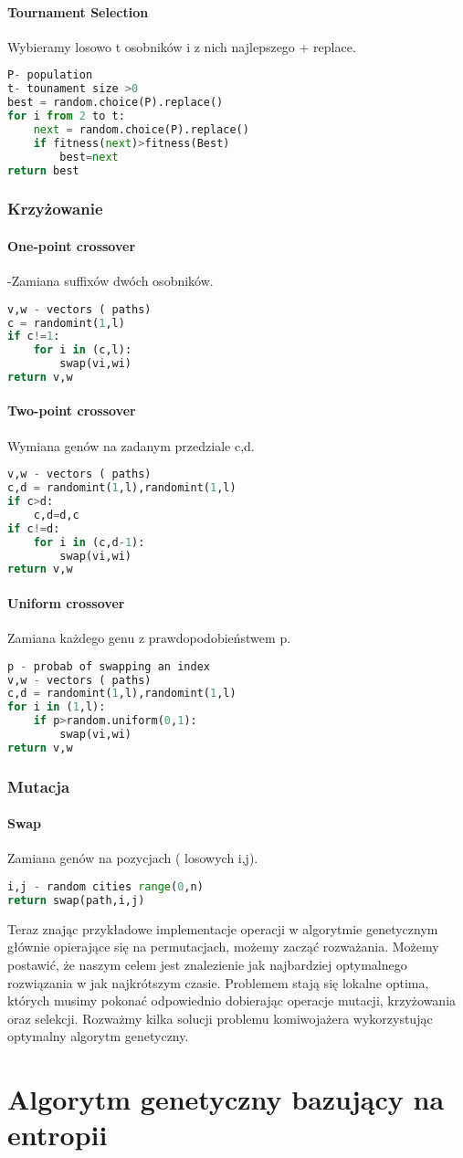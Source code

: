 \documentclass[11pt]{article}
\begin{document}
\paragraph{Tournament Selection}Wybieramy losowo t osobników i z nich najlepszego + replace.
\begin{lstlisting}[language=Python]
P- population
t- tounament size >0
best = random.choice(P).replace()
for i from 2 to t:
	next = random.choice(P).replace()
	if fitness(next)>fitness(Best)
		best=next
return best
\end{lstlisting}

\subsubsection{Krzyżowanie}
\paragraph{One-point crossover}-Zamiana suffixów dwóch osobników.
\begin{lstlisting}[language=Python ]
v,w - vectors ( paths)
c = randomint(1,l)
if c!=1:
	for i in (c,l):
		swap(vi,wi)
return v,w
\end{lstlisting}
\paragraph{Two-point crossover}Wymiana genów na zadanym przedziale c,d.
\begin{lstlisting}[language=Python]
v,w - vectors ( paths)
c,d = randomint(1,l),randomint(1,l)
if c>d:
	c,d=d,c
if c!=d:
	for i in (c,d-1):
		swap(vi,wi)
return v,w
\end{lstlisting}
\paragraph{Uniform crossover}Zamiana każdego genu z prawdopodobieństwem p.
\begin{lstlisting}[language=Python]
p - probab of swapping an index
v,w - vectors ( paths)
c,d = randomint(1,l),randomint(1,l)
for i in (1,l):
	if p>random.uniform(0,1):
		swap(vi,wi)
return v,w
\end{lstlisting}
\subsubsection{Mutacja}
\paragraph{Swap} Zamiana genów na pozycjach ( losowych i,j).
\begin{lstlisting}[language=Python]
i,j - random cities range(0,n)
return swap(path,i,j)
\end{lstlisting}
Teraz znając przykładowe implementacje operacji w algorytmie genetycznym głównie opierające się na permutacjach, możemy zacząć rozważania. Możemy postawić, że naszym celem jest znalezienie jak najbardziej optymalnego rozwiązania w jak najkrótszym czasie. Problemem stają się lokalne optima, których musimy pokonać odpowiednio dobierając operacje mutacji, krzyżowania oraz selekcji. Rozważmy kilka solucji problemu komiwojażera wykorzystując optymalny algorytm genetyczny.
\section{Algorytm genetyczny bazujący na entropii}
\end{document}
